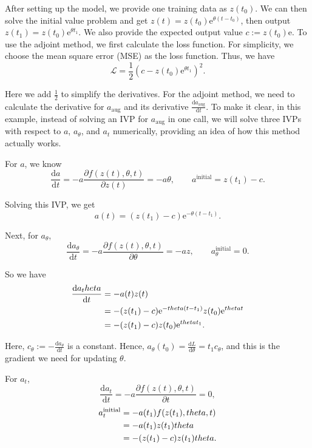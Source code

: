 \documentclass[a4paper,11pt,titlepage]{article}
\theoremstyle{definition}
\theoremstyle{plain}
\theoremstyle{remark}
\begin{document}
After setting up the model, we provide one training data as $z(t_0)$. We can then solve the initial value problem and get $z(t) = z(t_0)\mathrm{e}^{\theta(t-t_0)}$, then output $z(t_1)=z(t_0)\mathrm{e}^{\theta t_1}$. We also provide the expected output value $c:=z(t_0)\mathrm{e}$.
To use the adjoint method, we first calculate the loss function. For simplicity, we choose the mean square error (MSE) as the loss function. Thus, we have
$$\mathcal{L} = \frac{1}{2}\left(c-z(t_0)\mathrm{e}^{\theta t_1}\right)^2.$$

Here we add $\frac{1}{2}$ to simplify the derivatives.
For the adjoint method, we need to calculate the derivative for $a_{\mathrm{aug}}$ and its derivative $\frac{\mathrm{d}a_{\mathrm{aug}}}{\mathrm{d}t}$. To make it clear, in this example, instead of solving an IVP for $a_{\mathrm{aug}}$ in one call, we will solve three IVPs with respect to $a$, $a_\theta$, and $a_t$ numerically, providing an idea of how this method actually works.

For $a$, we know $$\frac{\mathrm{d}{a}}{\mathrm{d}{t}}=-a\frac{\partial f(z(t),\theta,t)}{\partial z(t)}=-a\theta,\quad\quad a^{\mathrm{initial}} = z(t_1)-c.$$

Solving this IVP, we get $$a(t)= (z(t_1)-c)\mathrm{e}^{-\theta(t-t_1)}.$$

Next, for $a_\theta$, $$\frac{\mathrm{d}{a_\theta}}{\mathrm{d}{t}}=-a\frac{\partial f(z(t),\theta,t)}{\partial \theta}=-az,\quad\quad a^{\mathrm{initial}}_\theta=0.$$

So we have
\begin{align}
\frac{\mathrm{d}{a_\theta}}{\mathrm{d}{t}}&=-a(t)z(t)\notag\\
&= -(z(t_1)-c)\mathrm{e}^{-\theta(t-t_1)}z(t_0)\mathrm{e}^{\theta t}\notag\\
&= -(z(t_1)-c)z(t_0)\mathrm{e}^{\theta t_1}.\notag
\end{align}

Here, $c_\theta:=-\frac{\mathrm{d}{a_\theta}}{\mathrm{d}{t}}$ is a constant. Hence, $a_\theta(t_0) =\frac{\mathrm{d}L}{\mathrm{d}\theta} =t_1c_\theta$, and this is the gradient we need for updating $\theta$.

For $a_t$,
$$
\frac{\mathrm{d}{a_t}}{\mathrm{d}{t}}=-a\frac{\partial f(z(t),\theta,t)}{\partial t}=0,
$$
\begin{align}
a^{\mathrm{initial}}_t &= -a(t_1)f(z(t_1),\theta,t)\notag\\
&=-a(t_1)z(t_1)\theta\notag\\
&=-(z(t_1)-c)z(t_1)\theta.\notag
\end{align}
\end{document}
